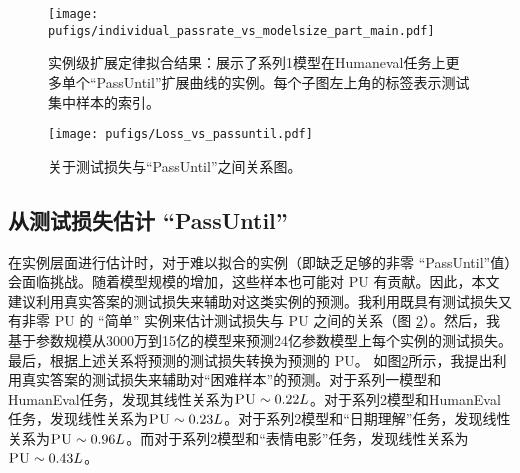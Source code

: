 \begin{figure}[htbp]
    \centering
    \texttt{[image: pufigs/individual\_passrate\_vs\_modelsize\_part\_main.pdf]}
    \label{fig:idp_with_modelsize_part1}
    \caption{实例级扩展定律拟合结果：展示了系列1模型在Humaneval任务上更多单个“PassUntil”扩展曲线的实例。每个子图左上角的标签表示测试集中样本的索引。}
\end{figure}

\begin{figure}[!htbp]
    \centering
    \texttt{[image: pufigs/Loss\_vs\_passuntil.pdf]}
    \caption{关于测试损失与“PassUntil”之间关系图。}
\label{fig:loss_vs_passuntil}
\end{figure}

\subsection{从测试损失估计 “PassUntil”}

在实例层面进行估计时，对于难以拟合的实例（即缺乏足够的非零 “PassUntil”值）会面临挑战。随着模型规模的增加，这些样本也可能对 \textsc{PU} 有贡献。因此，本文建议利用真实答案的测试损失来辅助对这类实例的预测。我利用既具有测试损失又有非零 \textsc{PU} 的 “简单” 实例来估计测试损失与 \textsc{PU} 之间的关系（图 \ref{fig:loss_vs_passuntil}）。然后，我基于参数规模从3000万到15亿的模型来预测24亿参数模型上每个实例的测试损失。最后，根据上述关系将预测的测试损失转换为预测的 \textsc{PU}。
如图\ref{fig:loss_vs_passuntil}所示，我提出利用真实答案的测试损失来辅助对“困难样本”的预测。对于系列一模型和HumanEval任务，发现其线性关系为\(\textsc{PU} \sim 0.22L\)。对于系列2模型和HumanEval任务，发现线性关系为\(\textsc{PU} \sim 0.23L\)。对于系列2模型和“日期理解”任务，发现线性关系为\(\textsc{PU} \sim 0.96L\)。而对于系列2模型和“表情电影”任务，发现线性关系为\(\textsc{PU} \sim 0.43L\)。 


\begin{table}[!htbp]
    \centering
    \caption{本文任务性能可预测框架的效果：预测值与模型实际性能的预测对比。任务名称后的数字表示评估中使用的模型系列。}
    \label{tab:final_fit_result}
\end{table}



